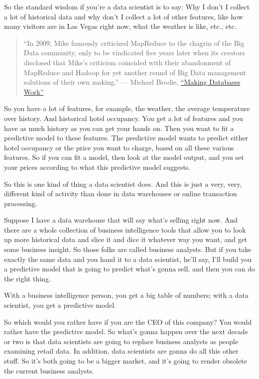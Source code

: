 \documentclass[a4paper,12pt,notitlepage,twoside,openright]{article}
\begin{document}
So the standard wisdom if you're a data scientist is to say: Why I don't
I collect a lot of historical data and why don't I collect a lot of
other features, like how many visitors are in Las Vegas right now, what
the weather is like, etc., etc.

\begin{quote}
``In 2009, Mike famously criticized MapReduce to the chagrin of the Big
Data community, only to be vindicated five years later when its creators
disclosed that Mike's criticism coincided with their abandonment of
MapReduce and Hadoop for yet another round of Big Data management
solutions of their own making.'' --- Michael Brodie,
\href{https://www.amazon.com/Making-Databases-Work-Pragmatic-Stonebraker/dp/1947487167/ref=sr_1_1?ie=UTF8\&qid=1549040750\&sr=8-1\&keywords=\%22Making+Databases+Work\%22}{{``Making
Databases Work''}}
\end{quote}

So you have a lot of features, for example, the weather, the average
temperature over history. And historical hotel occupancy. You get a lot
of features and you have as much history as you can get your hands on.
Then you want to fit a predictive model to these features. The
predictive model wants to predict either hotel occupancy or the price
you want to charge, based on all these various features. So if you can
fit a model, then look at the model output, and you set your prices
according to what this predictive model suggests.

So this is one kind of thing a data scientist does. And this is just a
very, very, different kind of activity than done in data warehouses or
online transaction processing.

Suppose I have a data warehouse that will say what's selling right now.
And there are a whole collection of business intelligence tools that
allow you to look up more historical data and slice it and dice it
whatever way you want, and get some business insight. So those folks are
called business analysts. But if you take exactly the same data and you
hand it to a data scientist, he'll say, I'll build you a predictive
model that is going to predict what's gonna sell, and then you can do
the right thing.

With a business intelligence person, you get a big table of numbers;
with a data scientist, you get a predictive model.

So which would you rather have if you are the CEO of this company? You
would rather have the predictive model. So what's gonna happen over the
next decade or two is that data scientists are going to replace business
analysts as people examining retail data. In addition, data scientists
are gonna do all this other stuff. So it's both going to be a bigger
market, and it's going to render obsolete the current business analysts.
\end{document}
